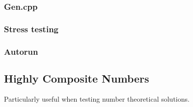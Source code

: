 \subsubsection{Gen.cpp}
\subsubsection{Stress testing}
%
\subsubsection{Autorun}
%
\subsection{Highly Composite Numbers}
Particularly useful when testing number theoretical solutions.





